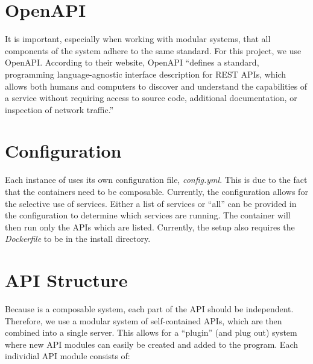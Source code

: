 \section{OpenAPI}

It is important, especially when working with modular systems, that all
components of the system adhere to the same standard. For this project,
we use OpenAPI. According to their website, OpenAPI ``defines a standard,
programming language-agnostic interface description for REST APIs, which allows
both humans and computers to discover and understand the capabilities of a
service without requiring access to source code, additional documentation,
or inspection of network traffic.''\cite{hid-sp18-526-www-openapi}

\section{Configuration}

Each instance of \projectname uses its own configuration file, \textit{config.yml}. This is due to the fact that the containers need to be composable. Currently, the configuration allows for the selective use of services. Either a list of services or ``all'' can be provided in the configuration to determine which services are running. The container will then run only the APIs which are listed. Currently, the setup also requires the \textit{Dockerfile} to be in the install directory.

\section{API Structure}

Because \projectname is a composable system, each part of the API should be independent. Therefore, we use a modular system of self-contained APIs, which are then combined into a single server. This allows for a ``plugin'' (and plug out) system where new API modules can easily be created and added to the program. Each individial API module consists of:


